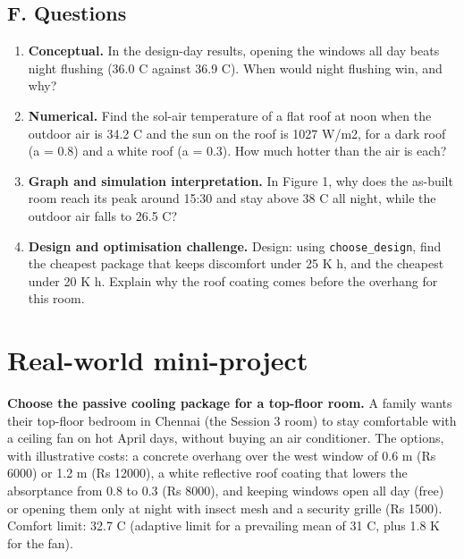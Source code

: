 \documentclass[11pt,a4paper]{article}
\begin{document}
\subsection*{F. Questions}
\begin{enumerate}[nosep]
\item \textbf{Conceptual.} In the design-day results, opening the windows all day beats night flushing (36.0 C against 36.9 C). When would night flushing win, and why?
\item \textbf{Numerical.} Find the sol-air temperature of a flat roof at noon when the outdoor air is 34.2 C and the sun on the roof is 1027 W/m2, for a dark roof (a = 0.8) and a white roof (a = 0.3). How much hotter than the air is each?
\item \textbf{Graph and simulation interpretation.} In Figure 1, why does the as-built room reach its peak around 15:30 and stay above 38 C all night, while the outdoor air falls to 26.5 C?
\item \textbf{Design and optimisation challenge.} Design: using \texttt{choose\_design}, find the cheapest package that keeps discomfort under 25 K h, and the cheapest under 20 K h. Explain why the roof coating comes before the overhang for this room.
\end{enumerate}

\section{Real-world mini-project}
\textbf{Choose the passive cooling package for a top-floor room.} A family wants their top-floor bedroom in Chennai (the Session 3 room) to stay comfortable with a ceiling fan on hot April days, without buying an air conditioner. The options, with illustrative costs: a concrete overhang over the west window of 0.6 m (Rs 6000) or 1.2 m (Rs 12000), a white reflective roof coating that lowers the absorptance from 0.8 to 0.3 (Rs 8000), and keeping windows open all day (free) or opening them only at night with insect mesh and a security grille (Rs 1500). Comfort limit: 32.7 C (adaptive limit for a prevailing mean of 31 C, plus 1.8 K for the fan).
\end{document}
